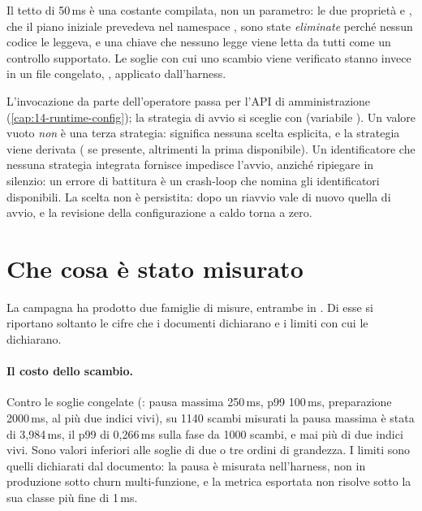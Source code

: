 Il tetto di 50\,ms \`e una costante compilata, non un parametro: le due propriet\`a
 e , che il piano iniziale
prevedeva nel namespace , sono state \emph{eliminate}
perch\'e nessun codice le leggeva, e una chiave che nessuno legge viene letta da
tutti come un controllo supportato. Le soglie con cui uno scambio viene verificato
stanno invece in un file congelato, , applicato dall'harness.

L'invocazione da parte dell'operatore passa per l'API di amministrazione
(\cref{cap:14-runtime-config}); la strategia di avvio si sceglie con
 (variabile ).
Un valore vuoto \emph{non} \`e una terza strategia: significa nessuna scelta
esplicita, e la strategia viene derivata ( se presente,
altrimenti la prima disponibile). Un identificatore che nessuna strategia integrata
fornisce impedisce l'avvio, anzich\'e ripiegare in silenzio: un errore di
battitura \`e un crash-loop che nomina gli identificatori disponibili. La scelta non
\`e persistita: dopo un riavvio vale di nuovo quella di avvio, e la revisione della
configurazione a caldo torna a zero.

\section{Che cosa \`e stato misurato}

La campagna ha prodotto due famiglie di misure, entrambe in
. Di esse si riportano soltanto
le cifre che i documenti dichiarano e i limiti con cui le dichiarano.

\paragraph{Il costo dello scambio.} Contro le soglie congelate
(: pausa massima 250\,ms, p99 100\,ms, preparazione 2000\,ms,
al pi\`u due indici vivi), su 1140 scambi misurati la pausa massima \`e stata
di 3,984\,ms, il p99 di 0,266\,ms sulla fase da 1000 scambi, e mai pi\`u di due
indici vivi. Sono valori inferiori alle soglie di due o tre ordini di grandezza.
I limiti sono quelli dichiarati dal documento: la pausa \`e misurata nell'harness, non
in produzione sotto churn multi-funzione, e la metrica esportata non risolve sotto la
sua classe pi\`u fine di 1\,ms.


